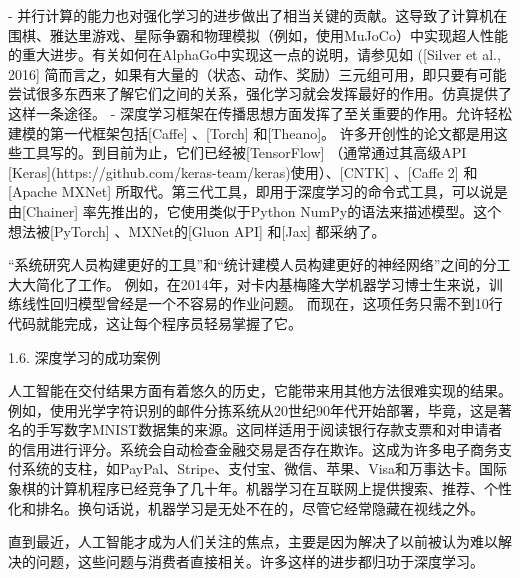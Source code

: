 - 并行计算的能力也对强化学习的进步做出了相当关键的贡献。这导致了计算机在围棋、雅达里游戏、星际争霸和物理模拟（例如，使用MuJoCo）中实现超人性能的重大进步。有关如何在AlphaGo中实现这一点的说明，请参见如 ([Silver et al., 2016]
简而言之，如果有大量的（状态、动作、奖励）三元组可用，即只要有可能尝试很多东西来了解它们之间的关系，强化学习就会发挥最好的作用。仿真提供了这样一条途径。
- 深度学习框架在传播思想方面发挥了至关重要的作用。允许轻松建模的第一代框架包括[Caffe]%
、[Torch]%
和[Theano]。%
许多开创性的论文都是用这些工具写的。到目前为止，它们已经被[TensorFlow]%
（通常通过其高级API [Keras](https://github.com/keras-team/keras)使用）、[CNTK]%
、[Caffe 2]%
和[Apache MXNet]%
所取代。第三代工具，即用于深度学习的命令式工具，可以说是由[Chainer]
率先推出的，它使用类似于Python NumPy的语法来描述模型。这个想法被[PyTorch]
、MXNet的[Gluon API]%
和[Jax]%
都采纳了。

“系统研究人员构建更好的工具”和“统计建模人员构建更好的神经网络”之间的分工大大简化了工作。 例如，在2014年，对卡内基梅隆大学机器学习博士生来说，训练线性回归模型曾经是一个不容易的作业问题。 而现在，这项任务只需不到10行代码就能完成，这让每个程序员轻易掌握了它。

 1.6. 深度学习的成功案例

人工智能在交付结果方面有着悠久的历史，它能带来用其他方法很难实现的结果。例如，使用光学字符识别的邮件分拣系统从20世纪90年代开始部署，毕竟，这是著名的手写数字MNIST数据集的来源。这同样适用于阅读银行存款支票和对申请者的信用进行评分。系统会自动检查金融交易是否存在欺诈。这成为许多电子商务支付系统的支柱，如PayPal、Stripe、支付宝、微信、苹果、Visa和万事达卡。国际象棋的计算机程序已经竞争了几十年。机器学习在互联网上提供搜索、推荐、个性化和排名。换句话说，机器学习是无处不在的，尽管它经常隐藏在视线之外。

直到最近，人工智能才成为人们关注的焦点，主要是因为解决了以前被认为难以解决的问题，这些问题与消费者直接相关。许多这样的进步都归功于深度学习。

